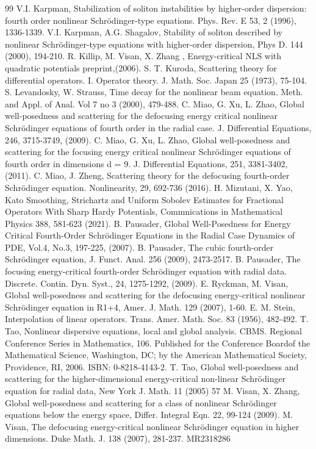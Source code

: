 \documentclass[11pt,a4paper]{article}
\numberwithin{equation}{section}
\begin{document}
\begin{thebibliography}{99}
V.I. Karpman, Stabilization of soliton instabilities by higher-order dispersion: fourth order nonlinear Schr\"{o}dinger-type equations. Phys. Rev. E 53, 2 (1996), 1336-1339.
V.I. Karpman, A.G. Shagalov, Stability of soliton described by nonlinear Schr\"{o}dinger-type equations with higher-order dispersion, Phys D. 144 (2000), 194-210.
R. Killip, M. Visan, X. Zhang , Energy-critical NLS with quadratic potentials preprint,(2006).
S. T. Kuroda, Scattering theory for differential operators. I. Operator theory. J. Math. Soc. Japan 25 (1973), 75-104.
S. Levandosky, W. Strauss, Time decay for the nonlinear beam equation. Meth. and Appl. of Anal. Vol 7 no 3 (2000), 479-488.
C. Miao, G. Xu, L. Zhao, Global well-posedness and scattering for the defocusing energy critical nonlinear Schr\"{o}dinger equations of fourth order in the radial case. J. Differential Equations, 246, 3715-3749, (2009).
C. Miao, G. Xu, L. Zhao, Global well-posedness and scattering for the focusing energy critical nonlinear Schr\"{o}dinger equations of fourth order in dimensions d = 9. J. Differential Equations, 251, 3381-3402, (2011).
C. Miao, J. Zheng, Scattering theory for the defocusing fourth-order Schr\"{o}dinger equation. Nonlinearity, 29, 692-736 (2016).
H. Mizutani, X. Yao, Kato Smoothing, Strichartz and Uniform Sobolev Estimates for Fractional Operators With Sharp Hardy Potentials, Commnications in Mathematical Physics 388, 581-623 (2021).
B. Pausader, Global Well-Posedness for Energy Critical Fourth-Order Schr\"{o}dinger Equations in the Radial Case Dynamics of PDE, Vol.4, No.3, 197-225, (2007).
B. Pausader, The cubic fourth-order Schr\"{o}dinger equation, J. Funct. Anal. 256 (2009), 2473-2517.
B. Pausader, The focusing energy-critical fourth-order Schr\"{o}dinger equation with radial data. Discrete. Contin. Dyn. Syst., 24, 1275-1292, (2009).
E. Ryckman, M. Visan, Global well-posedness and scattering for the defocusing energy-critical nonlinear Schr\"{o}dinger equation in R1+4, Amer. J. Math. 129 (2007), 1-60.
E. M. Stein, Interpolation of linear operators. Trans. Amer. Math. Soc. 83 (1956), 482-492.
T. Tao, Nonlinear dispersive equations, local and global analysis. CBMS. Regional Conference Series in Mathematics, 106. Published for the Conference Boardof the Mathematical Science, Washington, DC; by the American Mathematical Society, Providence, RI, 2006. ISBN: 0-8218-4143-2.
T. Tao, Global well-posedness and scattering for the higher-dimensional energy-critical non-linear Schr\"{o}dinger equation for radial data, New York J. Math. 11 (2005) 57
M. Visan, X. Zhang, Global well-posedness and scattering for a class of nonlinear Schr\"{o}dinger equations below the energy space, Differ. Integral Eqn. 22, 99-124 (2009).
M. Visan, The defocusing energy-critical nonlinear Schr\"{o}dinger equation in higher dimensions. Duke Math. J. 138 (2007), 281-237. MR2318286
\end{thebibliography}
\end{document}
